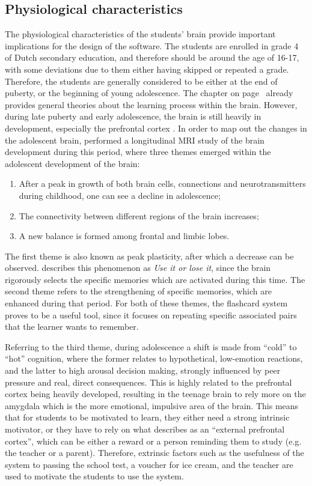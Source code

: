 \subsection{Physiological characteristics}
\label{subsec:physiologicalcharacteristics}

The physiological characteristics of the students' brain provide important implications for the design of the software. The students are enrolled in grade 4 of Dutch secondary education, and therefore should be around the age of 16-17, with some deviations due to them either having skipped or repeated a grade. Therefore, the students are generally considered to be either at the end of puberty, or the beginning of young adolescence. The  chapter on page~\pageref{ch:theory} already provides general theories about the learning process within the brain. However, during late puberty and early adolescence, the brain is still heavily in development, especially the prefrontal cortex \cite{blakemore}. In order to map out the changes in the adolescent brain,  performed a longitudinal MRI study of the brain development during this period, where three themes emerged within the adolescent development of the brain:
%
\begin{enumerate}
    \item After a peak in growth of both brain cells, connections and neurotransmitters during childhood, one can see a decline in adolescence;
    \item The connectivity between different regions of the brain increases;
    \item A new balance is formed among frontal and limbic lobes.
\end{enumerate}
%
The first theme is also known as peak plasticity, after which a decrease can be observed.  describes this phenomenon as \emph{Use it or lose it}, since the brain rigorously selects the specific memories which are activated during this time. The second theme refers to the strengthening of specific memories, which are enhanced during that period. For both of these themes, the flashcard system proves to be a useful tool, since it focuses on repeating specific associated pairs that the learner wants to remember.

Referring to the third theme, during adolescence a shift is made from ``cold'' to ``hot'' cognition, where the former relates to hypothetical, low-emotion reactions, and the latter to high arousal decision making, strongly influenced by peer pressure and real, direct consequences. This is highly related to the prefrontal cortex being heavily developed, resulting in the teenage brain to rely more on the amygdala which is the more emotional, impulsive area of the brain. This means that for students to be motivated to learn, they either need a strong intrinsic motivator, or they have to rely on what  describes as an ``external prefrontal cortex'', which can be either a reward or a person reminding them to study (e.g. the teacher or a parent). Therefore, extrinsic factors such as the usefulness of the system to passing the school test, a voucher for ice cream, and the teacher are used to motivate the students to use the system.

